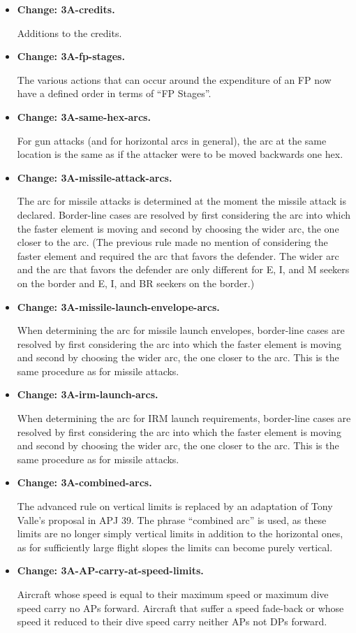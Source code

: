 \documentclass[10pt]{report}
\newcommand{\itemtag}[1]{\item \textbf{Change: #1.}\par}
\begin{document}
\begin{itemize}
    \itemtag{3A-credits} Additions to the credits.
    
    \itemtag{3A-fp-stages} The various actions that can occur around the expenditure of an FP now have a defined order in terms of “FP Stages”.
    
    \itemtag{3A-same-hex-arcs} For gun attacks (and for horizontal arcs in general), the arc at the same location is the same as if the attacker were to be moved backwards one hex.
    
    \itemtag{3A-missile-attack-arcs} The arc for missile attacks is determined at the moment the missile attack is declared. Border-line cases are resolved by first considering the arc into which the faster element is moving and second by choosing the wider arc, the one closer to the  arc. (The previous rule made no mention of considering the faster element and required the arc that favors the defender. The wider arc and the arc that favors the defender are only different for E, I, and M seekers on the  border and E, I, and BR seekers on the  border.)

    \itemtag{3A-missile-launch-envelope-arcs} When determining the arc for missile launch envelopes, border-line cases are resolved by first considering the arc into which the faster element is moving and second by choosing the wider arc, the one closer to the  arc. This is the same procedure as for missile attacks.    

    \itemtag{3A-irm-launch-arcs} When determining the arc for IRM launch requirements, border-line cases are resolved by first considering the arc into which the faster element is moving and second by choosing the wider arc, the one closer to the  arc. This is the same procedure as for missile attacks.    

    \itemtag{3A-combined-arcs} The advanced rule on vertical limits is replaced by an adaptation of Tony Valle's proposal in APJ 39. The phrase “combined arc” is used, as these limits are no longer simply vertical limits in addition to the horizontal ones, as for sufficiently large flight slopes the limits can become purely vertical.

    \itemtag{3A-AP-carry-at-speed-limits} Aircraft whose speed is equal to their maximum speed or maximum dive speed carry no APs forward. Aircraft that suffer a speed fade-back or whose speed it reduced to their dive speed carry neither APs not DPs forward.


\end{itemize}
\end{document}
